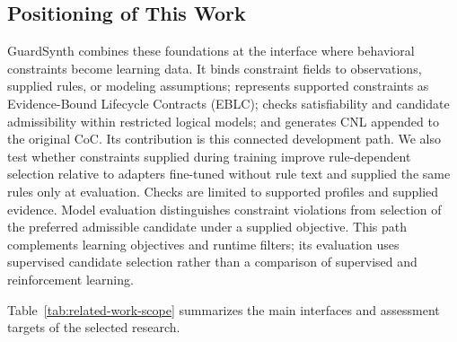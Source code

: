 \subsection{Positioning of This Work}

GuardSynth combines these foundations at the interface where behavioral
constraints become learning data. It binds constraint fields to
observations, supplied rules, or modeling assumptions; represents
supported constraints as Evidence-Bound Lifecycle Contracts (EBLC);
checks satisfiability and candidate admissibility within restricted logical models; and
generates CNL appended to the original CoC. Its contribution is this
connected development path. We also test whether constraints supplied during
training improve rule-dependent selection relative to adapters fine-tuned
without rule text and supplied the same rules only at evaluation. Checks are limited to supported profiles
and supplied evidence. Model evaluation distinguishes constraint violations
from selection of the preferred admissible candidate under a supplied
objective. This path complements learning objectives and runtime filters;
its evaluation uses supervised candidate selection rather than a comparison
of supervised and reinforcement learning.\par

Table~\ref{tab:related-work-scope} summarizes the main interfaces and
assessment targets of the selected research.\par

